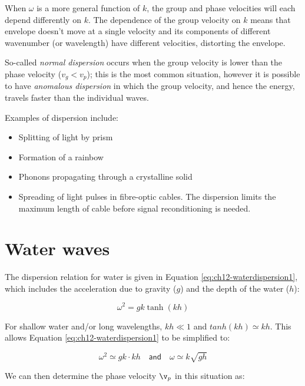 \documentclass[
]{book}
\providecommand{\tightlist}{%
  \setlength{\itemsep}{0pt}\setlength{\parskip}{0pt}}
\begin{document}
When \(\omega\) is a more general function of \(k\), the group and phase velocities will each depend differently on \(k\). The dependence of the group velocity on \(k\) means that envelope doesn't move at a single velocity and its components of different wavenumber (or wavelength) have different velocities, distorting the envelope.

So-called \emph{normal dispersion} occurs when the group velocity is lower than the phase velocity (\(v_g < v_p\)); this is the most common situation, however it is possible to have \emph{anomalous dispersion} in which the group velocity, and hence the energy, travels faster than the individual waves.

Examples of dispersion include:

\begin{itemize}
\tightlist
\item
  Splitting of light by prism
\item
  Formation of a rainbow
\item
  Phonons propagating through a crystalline solid
\item
  Spreading of light pulses in fibre-optic cables. The dispersion limits the maximum length of cable before signal reconditioning is needed.
\end{itemize}

\hypertarget{sec:ch12-waterwaves}{%
\section{Water waves}\label{sec:ch12-waterwaves}}

The dispersion relation for water is given in Equation \eqref{eq:ch12-waterdispersion1}, which includes the acceleration due to gravity (\(g\)) and the depth of the water (\(h\)):

\begin{equation}
\omega^2 = gk\tanh(kh)
\label{eq:ch12-waterdispersion1}
\end{equation}

For shallow water and/or long wavelengths, \(kh \ll 1\) and \(tanh(kh) \simeq kh\). This allows Equation \eqref{eq:ch12-waterdispersion1} to be simplified to:

\begin{equation}
\omega^2 \simeq gk \cdot kh \quad \textsf{and} \quad \omega \simeq k \sqrt{gh}
\end{equation}

We can then determine the phase velocity \(\v_p\) in this situation as:
\end{document}
